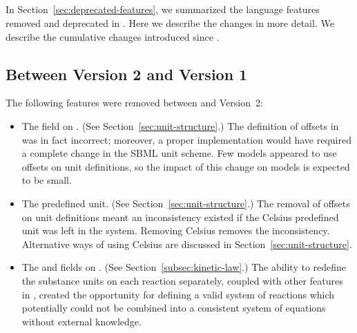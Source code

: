 
\begin{blockChanged}

\renewcommand{\thesection}{\changed{\Alph{section}}}
\section{}
\label{apdx:changes}
\renewcommand{\thesection}{\Alph{section}}

In Section~\ref{sec:deprecated-features}, we summarized the
language features removed and deprecated in \sbmltwothree.  Here
we describe the changes in more detail.  We describe the
cumulative changes introduced since \sbmltwoone.


\subsection{Between Version 2 and Version 1}

The following features were removed between \sbmltwoone and
Version~2:
\begin{itemize}
  
\item The  field on \UnitDefinition.  (See
  Section~\ref{sec:unit-structure}.)  The definition of offsets in
  \sbmltwoone was in fact incorrect; moreover, a proper
  implementation would have required a complete change in the SBML
  unit scheme.  Few models appeared to use offsets on unit
  definitions, so the impact of this change on models is expected
  to be small.
  
\item The  predefined unit.  (See
  Section~\ref{sec:unit-structure}.)  The removal of offsets on
  unit definitions meant an inconsistency existed if the Celsius
  predefined unit was left in the system.  Removing Celsius
  removes the inconsistency.  Alternative ways of using Celsius
  are discussed in Section~\ref{sec:unit-structure}.
  
\item The  and  fields on
  \KineticLaw.  (See Section~\ref{subsec:kinetic-law}.)  The
  ability to redefine the substance units on each reaction
  separately, coupled with other features in \sbmltwoone, created
  the opportunity for defining a valid system of reactions which
  potentially could not be combined into a consistent system of
  equations without external knowledge.


\end{itemize}
\end{blockChanged}
